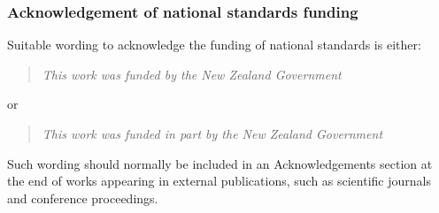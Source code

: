 \subsubsection{Acknowledgement of national standards funding} 
Suitable wording to acknowledge the funding of national standards is either:
\begin{quote}
\textit{This work was funded by the New Zealand Government}
\end{quote}
or
\begin{quote}
\textit{This work was funded in part by the New Zealand Government}
\end{quote}

Such wording should normally be included in an Acknowledgements section at the end of works appearing in external publications, such as scientific journals and conference proceedings.